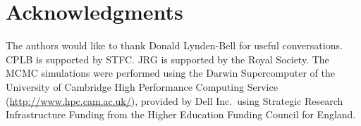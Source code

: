 \documentclass[useAMS,usedcolumn,usegraphicx,usenatbib]{mn2e}
\begin{document}
\section*{Acknowledgments}

The authors would like to thank Donald Lynden-Bell for useful conversations. CPLB is supported by STFC. JRG is supported by the Royal Society. The MCMC simulations were performed using the Darwin Supercomputer of the University of Cambridge High Performance Computing Service (\url{http://www.hpc.cam.ac.uk/}), provided by Dell Inc.\ using Strategic Research Infrastructure Funding from the Higher Education Funding Council for England.




\bsp

\label{lastpage}
\end{document}
